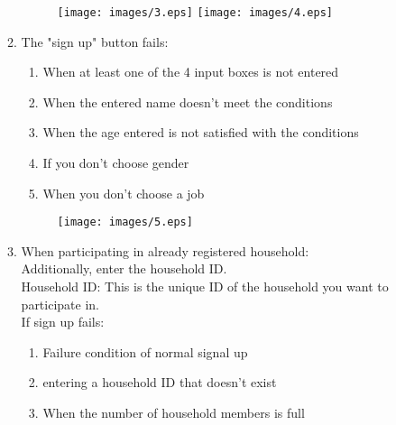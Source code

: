 \documentclass[11pt, conference]{IEEEtran}
\begin{document}
\begin{enumerate}[label=\arabic*]
\begin{enumerate}[label=\alph*]
        \begin{figure}[H]
            \centering
            \texttt{[image: images/3.eps]}
            \texttt{[image: images/4.eps]}
        \end{figure}
        \item The "sign up" button fails:
        \begin{enumerate}
            \item When at least one of the 4 input boxes is not entered
            \item When the entered name doesn't meet the conditions
            \item When the age entered is not satisfied with the conditions
            \item If you don't choose gender
            \item When you don't choose a job
        \end{enumerate}
        \begin{figure}[H]
            \centering
            \texttt{[image: images/5.eps]}
        \end{figure}
        \item When participating in already registered household:\\
        Additionally, enter the household ID.\\
        Household ID: This is the unique ID of the household you want to participate in.\\
        If sign up fails:
        \begin{enumerate}
            \item Failure condition of normal signal up
            \item entering a household ID that doesn't exist
            \item 	When the number of household members is full\\
        \end{enumerate}
    \end{enumerate}
    

\end{enumerate}
\end{document}
